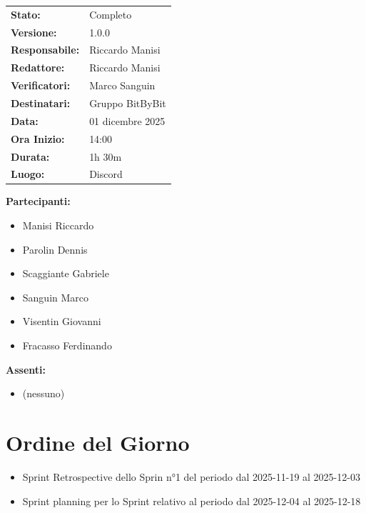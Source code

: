\documentclass[a4paper,12pt]{article}
\begin{document}
\begin{tcolorbox}
\begin{tabularx}{\textwidth}{@{}l X@{}}
\textbf{Stato:} & Completo\\
\textbf{Versione:} & 1.0.0\\
\textbf{Responsabile:} & Riccardo Manisi \\
\textbf{Redattore:} & Riccardo Manisi \\
\textbf{Verificatori:} & Marco Sanguin \\
\textbf{Destinatari:} & Gruppo BitByBit\\
\textbf{Data:} & 01 dicembre 2025 \\
\textbf{Ora Inizio:} & 14:00 \\
\textbf{Durata:} & 1h 30m \\
\textbf{Luogo:} & Discord \\
\end{tabularx}
\end{tcolorbox}

\vspace{0.4cm}
\textbf{Partecipanti:}
\begin{itemize}
    \item Manisi Riccardo
    \item Parolin Dennis
    \item Scaggiante Gabriele
    \item Sanguin Marco
    \item Visentin Giovanni
    \item Fracasso Ferdinando
\end{itemize}

\textbf{Assenti:}
\begin{itemize}
    \item (nessuno)
\end{itemize}

\clearpage

\vspace{0.5cm}

\vspace{0.8cm}

\clearpage
\tableofcontents
\thispagestyle{empty} %
\clearpage

\section{Ordine del Giorno}
\begin{itemize}
    \item Sprint Retrospective dello Sprin n°1 del periodo dal 2025-11-19 al 2025-12-03
    \item Sprint planning per lo Sprint relativo al periodo dal 2025-12-04 al 2025-12-18
\end{itemize}
\end{document}
